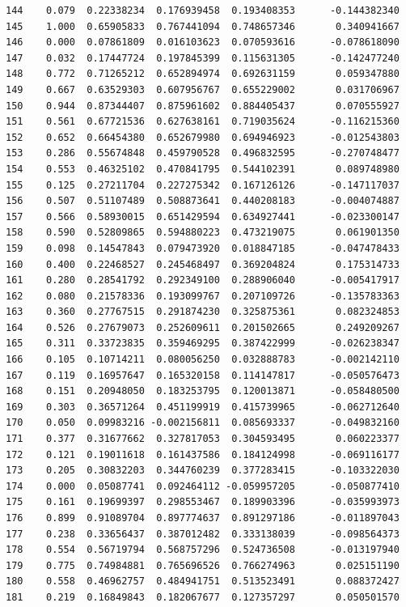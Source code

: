 \documentclass[
  letterpaper,
  DIV=11,
  numbers=noendperiod]{scrartcl}
\begin{document}
\begin{verbatim}
144    0.079  0.22338234  0.176939458  0.193408353      -0.144382340
145    1.000  0.65905833  0.767441094  0.748657346       0.340941667
146    0.000  0.07861809  0.016103623  0.070593616      -0.078618090
147    0.032  0.17447724  0.197845399  0.115631305      -0.142477240
148    0.772  0.71265212  0.652894974  0.692631159       0.059347880
149    0.667  0.63529303  0.607956767  0.655229002       0.031706967
150    0.944  0.87344407  0.875961602  0.884405437       0.070555927
151    0.561  0.67721536  0.627638161  0.719035624      -0.116215360
152    0.652  0.66454380  0.652679980  0.694946923      -0.012543803
153    0.286  0.55674848  0.459790528  0.496832595      -0.270748477
154    0.553  0.46325102  0.470841795  0.544102391       0.089748980
155    0.125  0.27211704  0.227275342  0.167126126      -0.147117037
156    0.507  0.51107489  0.508873641  0.440208183      -0.004074887
157    0.566  0.58930015  0.651429594  0.634927441      -0.023300147
158    0.590  0.52809865  0.594880223  0.473219075       0.061901350
159    0.098  0.14547843  0.079473920  0.018847185      -0.047478433
160    0.400  0.22468527  0.245468497  0.369204824       0.175314733
161    0.280  0.28541792  0.292349100  0.288906040      -0.005417917
162    0.080  0.21578336  0.193099767  0.207109726      -0.135783363
163    0.360  0.27767515  0.291874230  0.325875361       0.082324853
164    0.526  0.27679073  0.252609611  0.201502665       0.249209267
165    0.311  0.33723835  0.359469295  0.387422999      -0.026238347
166    0.105  0.10714211  0.080056250  0.032888783      -0.002142110
167    0.119  0.16957647  0.165320158  0.114147817      -0.050576473
168    0.151  0.20948050  0.183253795  0.120013871      -0.058480500
169    0.303  0.36571264  0.451199919  0.415739965      -0.062712640
170    0.050  0.09983216 -0.002156811  0.085693337      -0.049832160
171    0.377  0.31677662  0.327817053  0.304593495       0.060223377
172    0.121  0.19011618  0.161437586  0.184124998      -0.069116177
173    0.205  0.30832203  0.344760239  0.377283415      -0.103322030
174    0.000  0.05087741  0.092464112 -0.059957205      -0.050877410
175    0.161  0.19699397  0.298553467  0.189903396      -0.035993973
176    0.899  0.91089704  0.897774637  0.891297186      -0.011897043
177    0.238  0.33656437  0.387012482  0.333138039      -0.098564373
178    0.554  0.56719794  0.568757296  0.524736508      -0.013197940
179    0.775  0.74984881  0.765696526  0.766274963       0.025151190
180    0.558  0.46962757  0.484941751  0.513523491       0.088372427
181    0.219  0.16849843  0.182067677  0.127357297       0.050501570

\end{verbatim}
\end{document}
